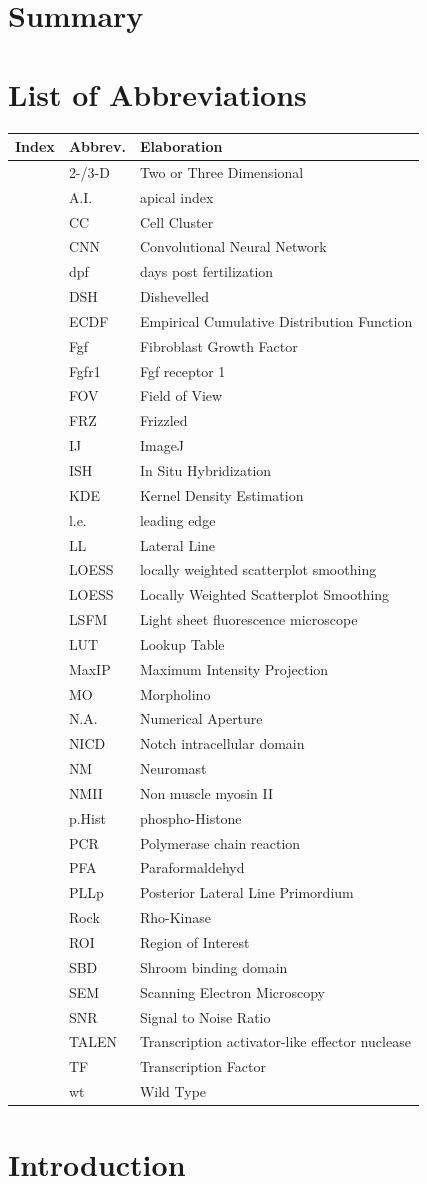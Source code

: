 \documentclass[11pt,singlespacinge,twoside]{reedthesis} %
\begin{document}
\hypertarget{summary}{%
\chapter*{Summary}\label{summary}}

\hypertarget{list-of-abbreviations}{%
\chapter*{List of Abbreviations}\label{list-of-abbreviations}}
\begin{longtable}[]{@{}lll@{}}
\toprule
\textbf{Index} & \textbf{Abbrev.} & \textbf{Elaboration}\tabularnewline
\midrule
\endhead
& 2-/3-D & Two or Three Dimensional\tabularnewline
& A.I. & apical index\tabularnewline
& CC & Cell Cluster\tabularnewline
& CNN & Convolutional Neural Network\tabularnewline
& dpf & days post fertilization\tabularnewline
& DSH & Dishevelled\tabularnewline
& ECDF & Empirical Cumulative Distribution Function\tabularnewline
& Fgf & Fibroblast Growth Factor\tabularnewline
& Fgfr1 & Fgf receptor 1\tabularnewline
& FOV & Field of View\tabularnewline
& FRZ & Frizzled\tabularnewline
& IJ & ImageJ\tabularnewline
& ISH & In Situ Hybridization\tabularnewline
& KDE & Kernel Density Estimation\tabularnewline
& l.e. & leading edge\tabularnewline
& LL & Lateral Line\tabularnewline
& LOESS & locally weighted scatterplot smoothing\tabularnewline
& LOESS & Locally Weighted Scatterplot Smoothing\tabularnewline
& LSFM & Light sheet fluorescence microscope\tabularnewline
& LUT & Lookup Table\tabularnewline
& MaxIP & Maximum Intensity Projection\tabularnewline
& MO & Morpholino\tabularnewline
& N.A. & Numerical Aperture\tabularnewline
& NICD & Notch intracellular domain\tabularnewline
& NM & Neuromast\tabularnewline
& NMII & Non muscle myosin II\tabularnewline
& p.Hist & phospho-Histone\tabularnewline
& PCR & Polymerase chain reaction\tabularnewline
& PFA & Paraformaldehyd\tabularnewline
& PLLp & Posterior Lateral Line Primordium\tabularnewline
& Rock & Rho-Kinase\tabularnewline
& ROI & Region of Interest\tabularnewline
& SBD & Shroom binding domain\tabularnewline
& SEM & Scanning Electron Microscopy\tabularnewline
& SNR & Signal to Noise Ratio\tabularnewline
& TALEN & Transcription activator-like effector nuclease\tabularnewline
& TF & Transcription Factor\tabularnewline
& wt & Wild Type\tabularnewline
\bottomrule
\end{longtable}
\hypertarget{Intro}{%
\chapter{Introduction}\label{Intro}}
\end{document}
